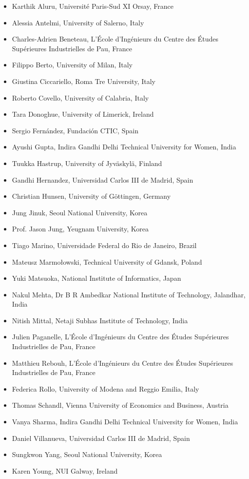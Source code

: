 \documentclass[10pt,a4paper]{res} %
\begin{document}
\begin{resume}
\begin{itemize} \itemsep -2pt %
\item Karthik Aluru, Universit\'{e} Paris-Sud XI Orsay, France
\item Alessia Antelmi, University of Salerno, Italy
\item Charles-Adrien Beneteau, L'\'{E}cole d'Ing\'{e}nieurs du Centre des \'{E}tudes Sup\'{e}rieures Industrielles de Pau, France
\item Filippo Berto, University of Milan, Italy
\item Giustina Ciccariello, Roma Tre University, Italy
\item Roberto Covello, University of Calabria, Italy
\item Tara Donoghue, University of Limerick, Ireland
\item Sergio Fern\'{a}ndez, Fundaci\'{o}n CTIC, Spain
\item Ayushi Gupta, Indira Gandhi Delhi Technical University for Women, India
\item Tuukka Hastrup, University of Jyv\"{a}skyl\"{a}, Finland
\item Gandhi Hernandez, Universidad Carlos III de Madrid, Spain
\item Christian Hunsen, University of G\"{o}ttingen, Germany
\item Jung Jinuk, Seoul National University, Korea
\item Prof. Jason Jung, Yeugnam University, Korea
\item Tiago Marino, Universidade Federal do Rio de Janeiro, Brazil
\item Mateusz Marmo{\l}owski, Technical University of Gdansk, Poland
\item Yuki Matsuoka, National Institute of Informatics, Japan
\item Nakul Mehta, Dr B R Ambedkar National Institute of Technology, Jalandhar, India
\item Nitish Mittal, Netaji Subhas Institute of Technology, India
\item Julien Paganelle, L'\'{E}cole d'Ing\'{e}nieurs du Centre des \'{E}tudes Sup\'{e}rieures Industrielles de Pau, France
\item Matthieu Rebouh, L'\'{E}cole d'Ing\'{e}nieurs du Centre des \'{E}tudes Sup\'{e}rieures Industrielles de Pau, France
\item Federica Rollo, University of Modena and Reggio Emilia, Italy
\item Thomas Schandl, Vienna University of Economics and Business, Austria
\item Vanya Sharma, Indira Gandhi Delhi Technical University for Women, India
\item Daniel Villanueva, Universidad Carlos III de Madrid, Spain
\item Sungkwon Yang, Seoul National University, Korea
\item Karen Young, NUI Galway, Ireland
\end{itemize}


\end{resume}
\end{document}
